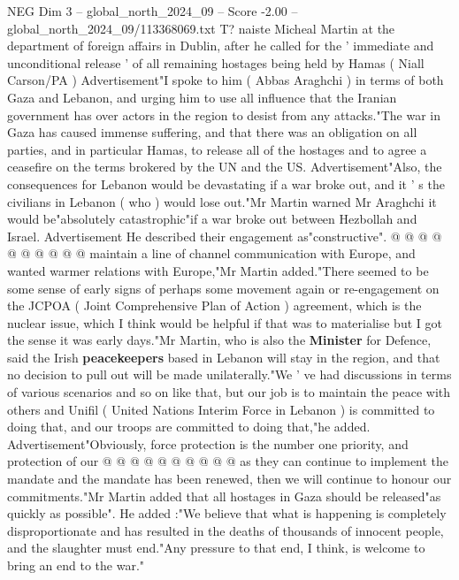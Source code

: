 \begin{textsample}{NEG Dim 3 – global\_north\_2024\_09 – Score -2.00 – global\_north\_2024\_09/113368069.txt}  \label{ex:f3_neg_291}
T? naiste Micheal Martin at the department of foreign affairs in Dublin, after he called for the ' immediate and unconditional release ' of all remaining hostages being held by Hamas ( Niall Carson/PA ) Advertisement"I spoke to him ( Abbas Araghchi ) in terms of both Gaza and Lebanon, and urging him to use all influence that the Iranian government has over actors in the region to desist from any attacks."The war in Gaza has caused immense suffering, and that there was an obligation on all parties, and in particular Hamas, to release all of the hostages and to agree a ceasefire on the terms brokered by the UN and the US.
Advertisement"Also, the consequences for Lebanon would be devastating if a war broke out, and it ' s the civilians in Lebanon ( who ) would lose out."Mr Martin warned Mr Araghchi it would be"absolutely catastrophic"if a war broke out between Hezbollah and Israel.
Advertisement He described their engagement as"constructive". @ @ @ @ @ @ @ @ @ @ maintain a line of channel communication with Europe, and wanted warmer relations with Europe,"Mr Martin added."There seemed to be some sense of early signs of perhaps some movement again or re-engagement on the JCPOA ( Joint Comprehensive Plan of Action ) agreement, which is the nuclear issue, which I think would be helpful if that was to materialise but I got the sense it was early days."Mr Martin, who is also the \textbf{Minister} for Defence, said the Irish \textbf{peacekeepers} based in Lebanon will stay in the region, and that no decision to pull out will be made unilaterally."We ' ve had discussions in terms of various scenarios and so on like that, but our job is to maintain the peace with others and Unifil ( United Nations Interim Force in Lebanon ) is committed to doing that, and our troops are committed to doing that,"he added.
Advertisement"Obviously, force protection is the number one priority, and protection of our @ @ @ @ @ @ @ @ @ @ as they can continue to implement the mandate and the mandate has been renewed, then we will continue to honour our commitments."Mr Martin added that all hostages in Gaza should be released"as quickly as possible".
He added :"We believe that what is happening is completely disproportionate and has resulted in the deaths of thousands of innocent people, and the slaughter must end."Any pressure to that end, I think, is welcome to bring an end to the war."

\end{textsample}
